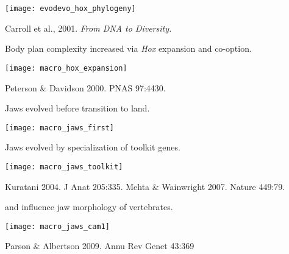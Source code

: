 \documentclass[t,handout]{beamer}  %
\newcommand{\backskip}{\vspace{-0.5\baselineskip}}
\begin{document}

\begin{frame}

\centering

\texttt{[image: evodevo\_hox\_phylogeny]}

\tinyfill Carroll et al., 2001. \textit{From DNA to Diversity.}
\end{frame}



\begin{frame}{Body plan complexity increased via \emph{Hox} expansion and co-option.}

\backskip

\centering

\texttt{[image: macro\_hox\_expansion]}

\tinyfill Peterson \& Davidson 2000. PNAS 97:4430.

\end{frame}


\begin{frame}{Jaws evolved before transition to land.}
\backskip

\centering

\texttt{[image: macro\_jaws\_first]}

\end{frame}

\begin{frame}{Jaws evolved by specialization of toolkit genes.}


\centering

\texttt{[image: macro\_jaws\_toolkit]}

\tinyfill Kuratani 2004. J Anat 205:335. Mehta \& Wainwright 2007. Nature 449:79.

\end{frame}

\begin{frame}{ and  influence jaw morphology of vertebrates.}

\backskip

\centering

\texttt{[image: macro\_jaws\_cam1]}

\tinyfill Parson \& Albertson 2009. Annu Rev Genet 43:369


\end{frame}
\end{document}
